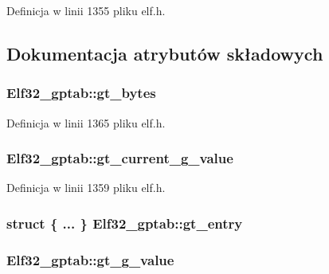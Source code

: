 Definicja w linii 1355 pliku elf.\-h.



\subsection{Dokumentacja atrybutów składowych}
\hypertarget{union_elf32__gptab_a1af9c483170a1b9e966d4c728934c7e0}{
\subsubsection[{gt\-\_\-bytes}]{ Elf32\-\_\-gptab\-::gt\-\_\-bytes}}\label{union_elf32__gptab_a1af9c483170a1b9e966d4c728934c7e0}


Definicja w linii 1365 pliku elf.\-h.

\hypertarget{union_elf32__gptab_a89ae523fa83704dc11651942f14b23f3}{
\subsubsection[{gt\-\_\-current\-\_\-g\-\_\-value}]{ Elf32\-\_\-gptab\-::gt\-\_\-current\-\_\-g\-\_\-value}}\label{union_elf32__gptab_a89ae523fa83704dc11651942f14b23f3}


Definicja w linii 1359 pliku elf.\-h.

\hypertarget{union_elf32__gptab_af0c0a5a25eff0b2129de1589a3eb6841}{
\subsubsection[{gt\-\_\-entry}]{\setlength{\rightskip}{0pt plus 5cm}struct \{ ... \}   Elf32\-\_\-gptab\-::gt\-\_\-entry}}\label{union_elf32__gptab_af0c0a5a25eff0b2129de1589a3eb6841}
\hypertarget{union_elf32__gptab_a5c6035560c772d9b020e5110dbb435b8}{
\subsubsection[{gt\-\_\-g\-\_\-value}]{ Elf32\-\_\-gptab\-::gt\-\_\-g\-\_\-value}}\label{union_elf32__gptab_a5c6035560c772d9b020e5110dbb435b8}


